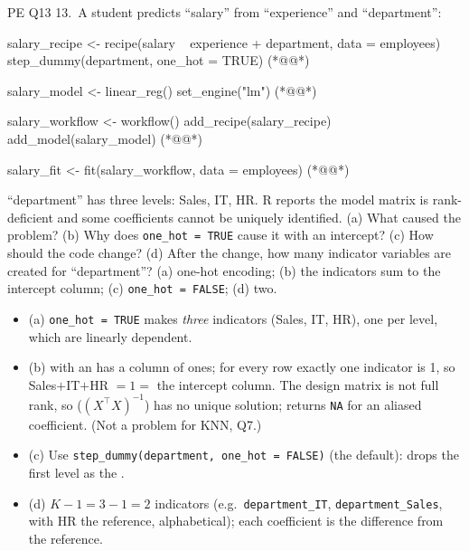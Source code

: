 \begin{qbox}{PE Q13}
13.~A student predicts ``salary'' from ``experience'' and ``department'':
\begin{rcode}
salary_recipe <- recipe(salary ~ experience + department,
                        data = employees) %
  step_dummy(department, one_hot = TRUE)                (*@@*)

salary_model <- linear_reg() %
  set_engine("lm")                                      (*@@*)

salary_workflow <- workflow() %
  add_recipe(salary_recipe) %
  add_model(salary_model)                               (*@@*)

salary_fit <- fit(salary_workflow, data = employees)    (*@@*)
\end{rcode}
``department'' has three levels: Sales, IT, HR. R reports the model matrix is rank-deficient and some coefficients cannot be uniquely identified. (a) What caused the problem? (b) Why does \texttt{one\_hot = TRUE} cause it with an intercept? (c) How should the code change? (d) After the change, how many indicator variables are created for ``department''?
\ans (a) one-hot encoding; (b) the indicators sum to the intercept column; (c) \texttt{one\_hot = FALSE}; (d) two.
\begin{itemize}[leftmargin=1em,itemsep=0pt]
\item (a) \texttt{one\_hot = TRUE} makes \emph{three} indicators (Sales, IT, HR), one per level, which are linearly dependent.
\item (b)  with an  has a column of ones; for every row exactly one indicator is 1, so Sales$+$IT$+$HR $=1=$ the intercept column. The design matrix is not full rank, so  ($(X^\top X)^{-1}$) has no unique solution;  returns \texttt{NA} for an aliased coefficient. (Not a problem for KNN, Q7.)
\item (c) Use \texttt{step\_dummy(department, one\_hot = FALSE)} (the default): drops the first level as the .
\item (d) $K-1=3-1=2$ indicators (e.g.\ \texttt{department\_IT}, \texttt{department\_Sales}, with HR the reference, alphabetical); each coefficient is the difference from the reference.
\end{itemize}
\end{qbox}

